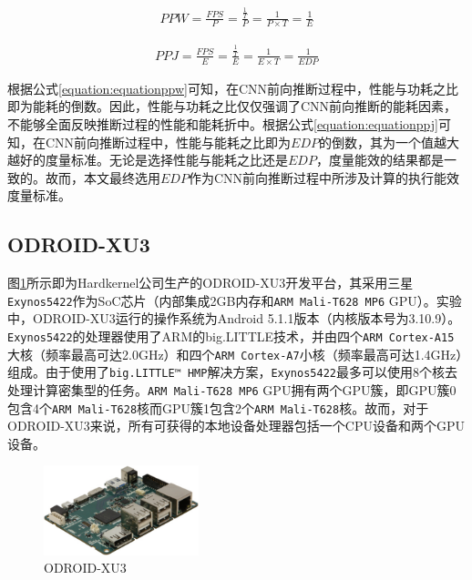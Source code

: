 \begin{equation}
     \label{equation:equationppw}
     \begin{aligned}
        PPW = \frac{FPS}{P}
        = \frac{\frac{1}{T}}{P}
        = \frac{1}{P \times T}
        = \frac{1}{E}
     \end{aligned}
\end{equation}

\begin{equation}
     \label{equation:equationppj}
     \begin{aligned}
        PPJ = \frac{FPS}{E}
        = \frac{\frac{1}{T}}{E}
        = \frac{1}{E \times T}
        = \frac{1}{EDP}
     \end{aligned}
\end{equation}

根据公式\ref{equation:equationppw}可知，在CNN前向推断过程中，性能与功耗之比即为能耗的倒数。因此，性能与功耗之比仅仅强调了CNN前向推断的能耗因素，不能够全面反映推断过程的性能和能耗折中。根据公式\ref{equation:equationppj}可知，在CNN前向推断过程中，性能与能耗之比即为$EDP$的倒数，其为一个值越大越好的度量标准。无论是选择性能与能耗之比还是$EDP$，度量能效的结果都是一致的。故而，本文最终选用$EDP$作为CNN前向推断过程中所涉及计算的执行能效度量标准。

\subsection{ODROID-XU3}
\label{chapter:chapter2-5-1}
图\ref{figure:figureodroid}所示即为Hardkernel公司生产的ODROID-XU3开发平台，其采用三星\texttt{Exynos5422}作为SoC芯片（内部集成2GB内存和\texttt{ARM Mali-T628 MP6} GPU）。实验中，ODROID-XU3运行的操作系统为Android 5.1.1版本（内核版本号为3.10.9）。\texttt{Exynos5422}的处理器使用了ARM的big.LITTLE技术，并由四个\texttt{ARM Cortex-A15}大核（频率最高可达2.0GHz）和四个\texttt{ARM Cortex-A7}小核（频率最高可达1.4GHz）组成。由于使用了\texttt{big.LITTLE™ HMP}解决方案，\texttt{Exynos5422}最多可以使用8个核去处理计算密集型的任务。\texttt{ARM Mali-T628 MP6} GPU拥有两个GPU簇，即GPU簇0包含4个\texttt{ARM Mali-T628}核而GPU簇1包含2个\texttt{ARM Mali-T628}核\cite{lokhmotov2015gemmbench}。故而，对于ODROID-XU3来说，所有可获得的本地设备处理器包括一个CPU设备和两个GPU设备\label{chapter:chapter1-1}。

\begin{figure}[htbp]
    \begin{center}
    \includegraphics[width=0.4\textwidth, height=0.4\textwidth]{figures/odroid.pdf}
    \end{center}
    \caption{ODROID-XU3}\label{figure:figureodroid}
\end{figure}

